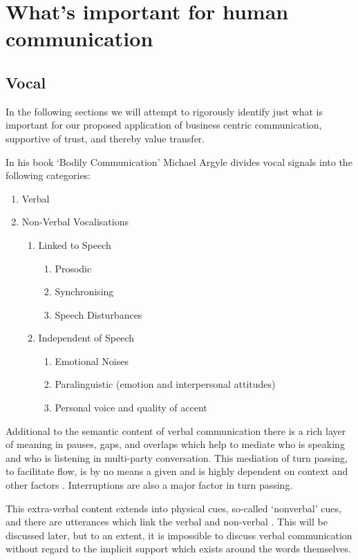 \section{What's important for human communication}
\subsection{Vocal}
In the following sections we will attempt to rigorously identify just what is important for our proposed application of business centric communication, supportive of trust, and thereby value transfer.\par
In his book `Bodily Communication' \cite{Argyle1988} Michael Argyle divides vocal signals into the following categories:
\begin{enumerate}
\item Verbal
\item Non-Verbal Vocalisations
\begin{enumerate}
       \item Linked to Speech
       \begin{enumerate}
         \item   Prosodic
         \item   Synchronising
         \item   Speech Disturbances
         \end{enumerate}
      \item  Independent of Speech
      \begin{enumerate}
        \item    Emotional Noises
         \item   Paralinguistic (emotion and interpersonal attitudes)
         \item   Personal voice and quality of accent
         \end{enumerate}
\end{enumerate}
\end{enumerate}               
Additional to the semantic content of verbal communication there is a rich layer of meaning in pauses, gaps, and overlaps \cite{Heldner2010} which help to mediate who is speaking and who is listening in multi-party conversation. This mediation of turn passing, to facilitate flow, is by no means a given and is highly dependent on context and other factors \cite{Kleinke1986}. Interruptions are also a major factor in turn passing.\par
This extra-verbal content \cite{Ting-Toomey2012} extends into physical cues, so-called `nonverbal' cues, and there are utterances which link the verbal and non-verbal \cite{Otsuka2005}. This will be discussed later, but to an extent, it is impossible to discuss verbal communication without regard to the implicit support which exists around the words themselves.\par
